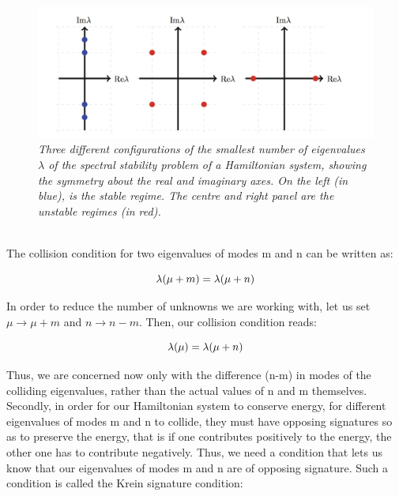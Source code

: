 \documentclass{article}
\begin{document}
\begin{figure}[htp]
\centering
\includegraphics[scale = 0.7]{Eigenvalues.png}
\caption{\emph{Three different configurations of the smallest number of eigenvalues \(\lambda\) of the spectral stability problem of a Hamiltonian system, showing the symmetry about the real and imaginary axes. On the left (in blue), is the stable regime. The centre and right panel are the unstable regimes (in red).}}\label{eigenvaluesgraph}

\end{figure}

\\

The collision condition for two eigenvalues of modes m and n can be written as:


 \begin{equation} \label{eq1}
  \lambda(\mu + m) = \lambda(\mu + n)
\\
\end{equation}

In order to reduce the number of unknowns we are working with, let us set \(\mu \rightarrow \mu + m \) and \(n \rightarrow n-m\). Then, our collision condition reads: 

 \begin{equation} \label{eigenvaluecollisioncondition}
  \lambda(\mu) = \lambda(\mu + n)
\\
\end{equation}

Thus, we are concerned now only with the difference (n-m) in modes of the colliding eigenvalues, rather than the actual values of n and m themselves. Secondly, in order for our Hamiltonian system to conserve energy, for different eigenvalues of modes m and n to collide, they must have opposing signatures so as to preserve the energy, that is if one contributes positively to the energy, the other one has to contribute negatively. Thus, we need a condition that lets us know that our eigenvalues of modes m and n are of opposing signature. Such a condition is called the Krein signature condition:
\end{document}
